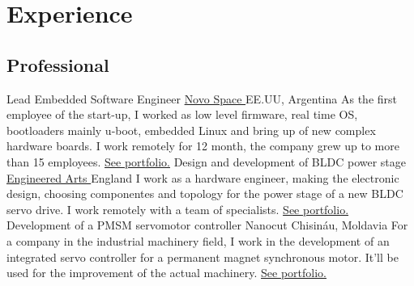 \section{Experience}
   \subsection{\bfseries{Professional}}
      {Lead Embedded Software Engineer                    }{\href{\linknovo                     }{ Novo Space        }  }{EE.UU, Argentina            }{}{ As the first employee of the start-up, I worked as low level firmware, real time OS, bootloaders mainly u-boot, embedded Linux and bring up of new complex hardware boards. I work remotely for 12 month, the company grew up to more than 15 employees. \hyperlink{subsec:novo_space}{See portfolio.}} %
      {Design and development of BLDC power stage         }{\href{\linkengarts                  }{ Engineered Arts   }  }{England                     }{}{ I work as a hardware engineer, making the electronic design, choosing componentes and topology for the power stage of a new BLDC servo drive. I work remotely with a team of specialists. \hyperlink {subsec:engineered_arts}{ See portfolio. }}
      {Development of a PMSM servomotor controller        }{Nanocut                                                     }{Chisináu, Moldavia          }{}{ For a company in the industrial machinery field, I work in the development of an integrated servo controller for a permanent magnet synchronous motor. It'll be used for the improvement of the actual machinery. \hyperlink{subsec:nanocut}{See portfolio.}}
